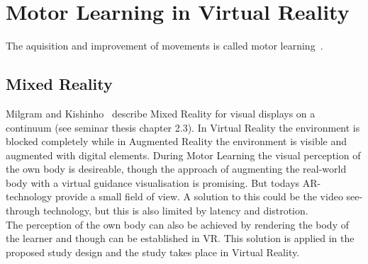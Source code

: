 \chapter{Motor Learning in Virtual Reality}
\label{chapter:theoretical_background}
The aquisition and improvement of movements is called motor learning~\cite{mlbook}. 

\section{Mixed Reality}
\label{section:mixed_reality}
Milgram and Kishinho~\cite{mrcontinuum} describe Mixed Reality for visual displays on a continuum (see seminar thesis chapter 2.3). In Virtual Reality the environment is blocked completely while in Augmented Reality the environment is visible and augmented with digital elements. During Motor Learning the visual perception of the own body is desireable, though the approach of augmenting the real-world body with a virtual guidance visualisation is promising. But todays AR-technology provide a small field of view. A solution to this could be the video see-through technology, but this is also limited by latency and distrotion.\\
The perception of the own body can also be achieved by rendering the body of the learner and though can be established in VR. This solution is applied in the proposed study design and the study takes place in Virtual Reality.

